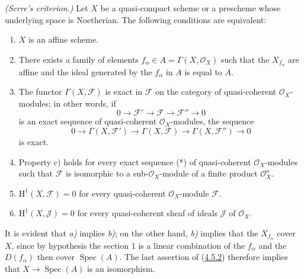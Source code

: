 \begin{theorem}[5.2.1]
\label{II.5.2.1}
\emph{(Serre's criterion.)} Let $X$ be a quasi-compact scheme or a prescheme
whose underlying space is Noetherian. The following conditions are
equivalent:
\begin{enumerate}
  \item[\rm{a)}] $X$ is an affine scheme.
  \item[\rm{b)}] There exists a family of elements
  $f_\alpha\in A=\Gamma(X,\mathcal{O}_X)$ such that the $X_{f_\alpha}$ are
  affine and the ideal generated by the $f_\alpha$ in $A$ is equal to
  $A$.
  \item[\rm{c)}] The functor $\Gamma(X,\mathcal{F})$ is exact in
  $\mathcal{F}$ on the category of quasi-coherent
  $\mathcal{O}_X$-modules; in other words, if
  \[
    0\to\mathcal{F}'\to\mathcal{F}\to\mathcal{F}''\to0 \tag{*}
  \]
  is an exact sequence of quasi-coherent $\mathcal{O}_X$-modules, the
  sequence
  \[
    0\to\Gamma(X,\mathcal{F}')\to\Gamma(X,\mathcal{F})
      \to\Gamma(X,\mathcal{F}'')\to0
  \]
  is exact.
  \item[\rm{c')}] Property \textup{c)} holds for every exact sequence \textup{(*)} of
  quasi-coherent $\mathcal{O}_X$-modules such that $\mathcal{F}$ is
  isomorphic to a sub-$\mathcal{O}_X$-module of a finite product
  $\mathcal{O}_X^n$.
  \item[\rm{d)}] $\mathrm{H}^1(X,\mathcal{F})=0$ for every
  quasi-coherent $\mathcal{O}_X$-module $\mathcal{F}$.
  \item[\rm{d')}] $\mathrm{H}^1(X,\mathcal{J})=0$ for every
  quasi-coherent sheaf of ideals $\mathcal{J}$ of $\mathcal{O}_X$.
\end{enumerate}
\end{theorem}

It is evident that \emph{a)} implies \emph{b)}; on the other hand, \emph{b)} implies that the
$X_{f_\alpha}$ cover $X$, since by hypothesis the section $1$ is a
linear combination of the $f_\alpha$ and the $D(f_\alpha)$ then cover
$\operatorname{Spec}(A)$. The last assertion of
(\hyperref[II.4.5.2]{4.5.2}) therefore implies that
$X\to\operatorname{Spec}(A)$ is an isomorphism.

